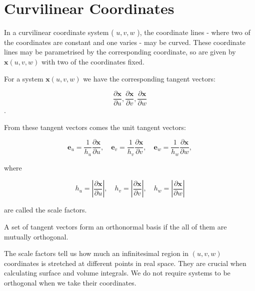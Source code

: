 \section{Curvilinear Coordinates}

\begin{definition}
  In a curvilinear coordinate system ( $u, v, w$ ), the coordinate lines - where two of the coordinates are constant and one varies - may be curved. These coordinate lines may be parametrised by the corresponding coordinate, so are given by $\boldsymbol{x}(u, v, w)$ with two of the coordinates fixed.
\end{definition}

\begin{definition}

  For a system $\mathbf{x}(u,v,w)$ we have the corresponding tangent vectors:

  $$\frac{\partial \boldsymbol{x}}{\partial u}, \frac{\partial \boldsymbol{x}}{\partial v}, \frac{\partial \boldsymbol{x}}{\partial w}$$.

\noindent From these tangent vectors comes the unit tangent vectors:

$$
\boldsymbol{e}_u=\frac{1}{h_u} \frac{\partial \boldsymbol{x}}{\partial u}, \quad \boldsymbol{e}_v=\frac{1}{h_v} \frac{\partial \boldsymbol{x}}{\partial v}, \quad \boldsymbol{e}_w=\frac{1}{h_w} \frac{\partial \boldsymbol{x}}{\partial w},
$$

\noindent where

$$
h_u=\left|\frac{\partial \boldsymbol{x}}{\partial u}\right|, \quad h_v=\left|\frac{\partial \boldsymbol{x}}{\partial v}\right|, \quad h_w=\left|\frac{\partial \boldsymbol{x}}{\partial w}\right|
$$

\noindent are called the scale factors.
\end{definition}

\begin{remark}
  A set of tangent vectors form an orthonormal basis if the all of them are mutually orthogonal.
\end{remark}

\begin{remark} The scale factors tell us how much an infinitesimal region in $(u,v,w)$ coordinates is stretched at different points in real space. They are crucial when calculating surface and volume integrals. We do not require systems to be orthogonal when we take their coordinates.
\end{remark}

